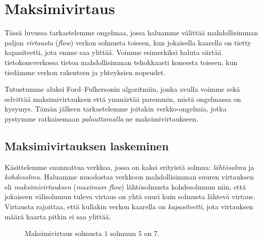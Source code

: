 \chapter{Maksimivirtaus}


Tässä luvussa tarkastelemme ongelmaa,
jossa haluamme välittää mahdollisimman paljon
\emph{virtausta} (\emph{flow}) verkon solmusta toiseen,
kun jokaisella kaarella on tietty kapasiteetti,
jota emme saa ylittää.
Voimme esimerkiksi haluta siirtää tietokoneverkossa tietoa
mahdollisimman tehokkaasti koneesta toiseen,
kun tiedämme verkon rakenteen ja yhteyksien nopeudet.

Tutustumme aluksi Ford–Fulkersonin algoritmiin,
jonka avulla voimme sekä selvittää maksimivirtauksen
että ymmärtää paremmin, mistä ongelmassa on kysymys.
Tämän jälkeen tarkastelemme joitakin verkko-ongelmia,
jotka pystymme ratkaisemaan \emph{palauttamalla}
ne maksimivirtaukseen.

\section{Maksimivirtauksen laskeminen}

Käsittelemme suunnattua verkkoa,
jossa on kaksi erityistä solmua:
\emph{lähtösolmu} ja \emph{kohdesolmu}.
Haluamme muodostaa verkkoon mahdollisimman
suuren virtauksen eli \emph{maksimivirtauksen} (\emph{maximum flow})
lähtösolmusta kohdesolmuun niin, että
jokaiseen välisolmuun tuleva virtaus on
yhtä suuri kuin solmusta lähtevä virtaus.
Virtausta rajoittaa, että kullakin verkon kaarella on
\emph{kapasiteetti}, jota virtauksen
määrä kaarta pitkin ei saa ylittää.

\begin{figure}
\center
\begin{center}
\end{center}
\caption{Maksimivirtaus solmusta $1$ solmuun $5$ on $7$.}
\label{fig:makvir}
\end{figure}

